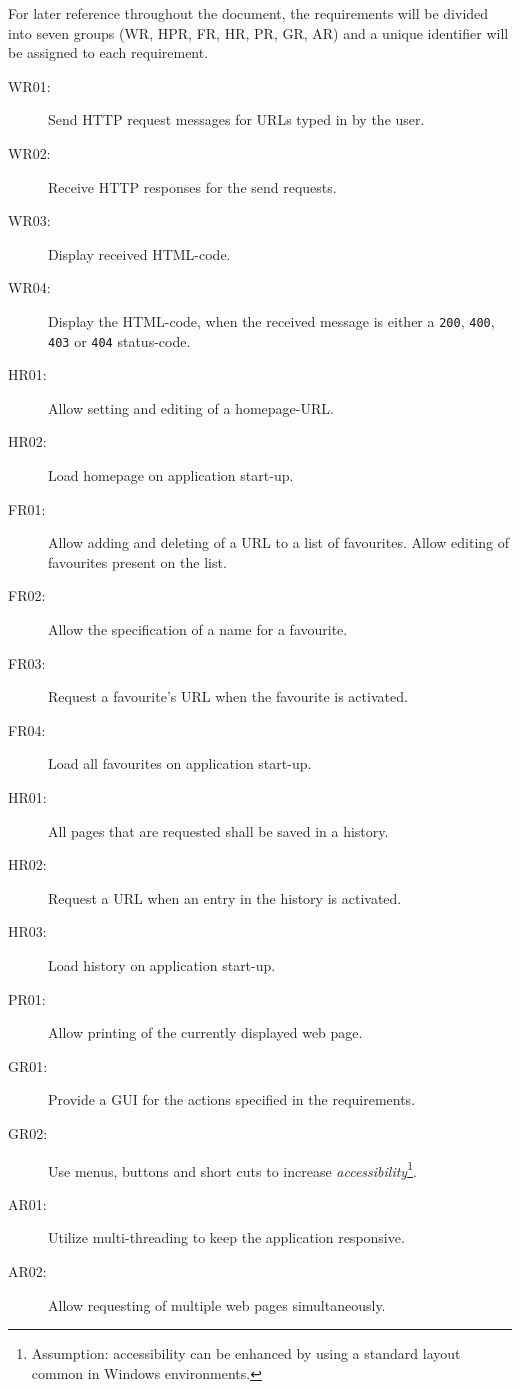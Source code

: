 For later reference throughout the document, the requirements will be divided into seven groups (\ac{WR}, \ac{HPR}, \ac{FR}, \ac{HR}, \ac{PR}, \ac{GR}, \ac{AR}) and a unique identifier will be assigned to each requirement.

\begin{description}
\item[WR01:] Send \ac{HTTP} request messages for \ac{URL}s typed in by the user.
\item[WR02:] Receive \ac{HTTP} responses for the send requests.
\item[WR03:] Display received \ac{HTML}-code.
\item[WR04:] Display the \ac{HTML}-code, when the received message is either a \texttt{200}, \texttt{400}, \texttt{403} or \texttt{404} status-code.
\item[HR01:] Allow setting and editing of a homepage-\ac{URL}.
\item[HR02:] Load homepage on application start-up.
\item[FR01:] Allow adding and deleting of a \ac{URL} to a list of favourites. Allow editing of favourites present on the list.
\item[FR02:] Allow the specification of a name for a favourite.
\item[FR03:] Request a favourite's \ac{URL} when the favourite is activated.
\item[FR04:] Load all favourites on application start-up.
\item[HR01:] All pages that are requested shall be saved in a history.
\item[HR02:] Request a \ac{URL} when an entry in the history is activated.
\item[HR03:] Load history on application start-up.
\item[PR01:] Allow printing of the currently displayed web page.
\item[GR01:] Provide a \ac{GUI} for the actions specified in the requirements.
\item[GR02:] Use menus, buttons and short cuts to increase \textit{accessibility}\footnote{Assumption: accessibility can be enhanced by using a standard layout common in Windows environments.}.
\item[AR01:] Utilize multi-threading to keep the application responsive.
\item[AR02:] Allow requesting of multiple web pages simultaneously.
\end{description}